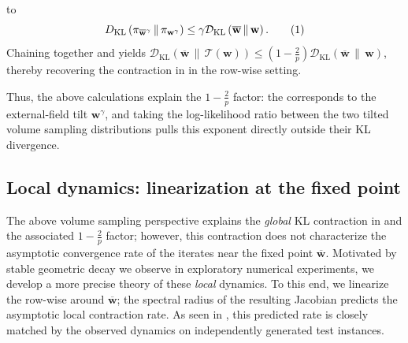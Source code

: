 \documentclass[11pt]{article}
\newcommand\numberthis{\addtocounter{equation}{1}\tag{\theequation}}
\theoremstyle{plain}
\numberwithin{equation}{section}
\newcommand{\bw}{\mathbf{w}}
\newcommand{\bwbar}{\overline{\mathbf{w}}}
\newcommand{\calT}{\mathcal{T}}
\newcommand{\omrp}{\gamma}
\newcommand{\kldiv}[2]{\mathcal{D}_{\mathrm{KL}}\left(#1 \,\|\, #2\right)}
\newcommand{\KL}[2]{D_{\mathrm{KL}}\left(#1 \,\|\, #2\right)}
\begin{document}
 to \[ \KL{\pi_{\bwbar^\omrp}}{\pi_{\bw^\omrp}} \leq \omrp \kldiv{\bwbar}{\bw}.\numberthis\label{eq:EI-con-4}\] Chaining together  and   yields $\kldiv{\bwbar}{\calT(\bw)}\leq \left(1-\frac{2}{p}\right)\kldiv{\bwbar}{\bw}$, thereby recovering the  contraction in  in the row-wise setting. 

Thus, the above calculations explain the $1-\frac{2}{p}$ factor: the  corresponds to the external-field tilt $\bw^{\omrp}$, and taking the log-likelihood ratio between the two tilted volume sampling distributions pulls this exponent directly outside their KL divergence. 

\subsection{Local dynamics: linearization at the fixed point}
\label{sec:local-dyn}
The above volume sampling perspective explains the \emph{global} KL contraction in  and the associated $1-\frac{2}{p}$ factor; however, this contraction does not characterize the asymptotic convergence rate of the iterates near the fixed point $\bwbar$. Motivated by stable geometric decay we observe in exploratory numerical experiments, we develop a more precise theory of these \emph{local} dynamics. 
To this end, we linearize the row-wise  around $\bwbar$; the spectral radius of the resulting Jacobian predicts the asymptotic local contraction rate. 
As seen in , this predicted rate is closely matched by the observed dynamics on independently generated test instances.
\end{document}
